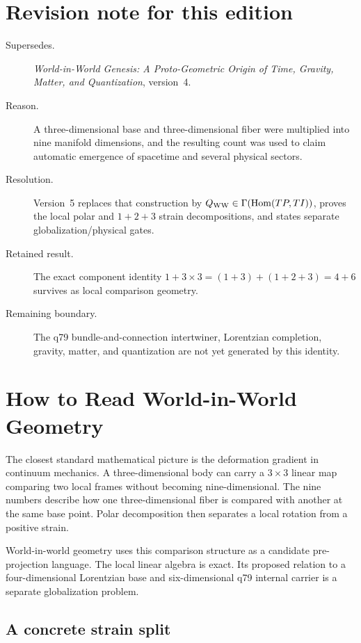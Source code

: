 \documentclass[11pt]{article}
\begin{document}
\section*{Revision note for this edition}
\begin{description}
\item[Supersedes.] \emph{World-in-World Genesis: A Proto-Geometric Origin of
Time, Gravity, Matter, and Quantization}, version~4.
\item[Reason.] A three-dimensional base and three-dimensional fiber were
multiplied into nine manifold dimensions, and the resulting count was used to
claim automatic emergence of spacetime and several physical sectors.
\item[Resolution.] Version~5 replaces that construction by
$Q_{\rm WW}\in\Gamma(\operatorname{Hom}(TP,TI))$, proves the local polar and
$1+2+3$ strain decompositions, and states separate globalization/physical
gates.
\item[Retained result.] The exact component identity
$1+3\times3=(1+3)+(1+2+3)=4+6$ survives as local comparison geometry.
\item[Remaining boundary.] The q79 bundle-and-connection intertwiner,
Lorentzian completion, gravity, matter, and quantization are not yet generated
by this identity.
\end{description}

\tableofcontents

\section{How to Read World-in-World Geometry}

The closest standard mathematical picture is the deformation gradient in
continuum mechanics.  A three-dimensional body can carry a $3\times3$ linear
map comparing two local frames without becoming nine-dimensional.  The nine
numbers describe how one three-dimensional fiber is compared with another at
the same base point.  Polar decomposition then separates a local rotation from
a positive strain.

World-in-world geometry uses this comparison structure as a candidate
pre-projection language.  The local linear algebra is exact.  Its proposed
relation to a four-dimensional Lorentzian base and six-dimensional q79
internal carrier is a separate globalization problem.

\subsection{A concrete strain split}
\end{document}
